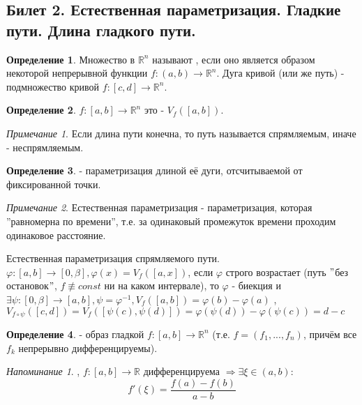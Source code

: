 \documentclass[a4paper]{article}
\theoremstyle{indented}
\theoremstyle{definition}
\newtheorem{defn}{Определение}
\theoremstyle{remark}
\newtheorem{remark}{Примечание}
\newtheorem{remind}{Напоминание}
\begin{document}
\subsection{Билет 2. Естественная параметризация. Гладкие пути. Длина гладкого пути.}

\begin{defn}
    Множество в $\mathbb{R}^n$ называют , если оно является образом некоторой непрерывной функции $f: (a,b)\to \mathbb{R}^n$. Дуга кривой (или же путь) - подмножество кривой $f: [c,d] \to \mathbb{R}^n$.
\end{defn}

\begin{defn}
     $f: [a,b]\to \mathbb{R}^n$ это - $V_f([a,b])$.
\end{defn}

\begin{remark}
    Если длина пути конечна, то путь называется спрямляемым, иначе - неспрямляемым.
\end{remark}

\begin{defn}
     - параметризация длиной её дуги, отсчитываемой от фиксированной точки.
\end{defn}

\begin{remark}
    Естественная параметризация - параметризация, которая ''равномерна по времени'', т.е. за одинаковый промежуток времени проходим одинаковое расстояние.
\end{remark}

Естественная параметризация спрямляемого пути. $\varphi:[a,b]\to[0,\beta], \varphi(x)=V_f([a,x])$, если $\varphi$ строго возрастает (путь $"$без остановок$"$, $f\not\equiv const$ ни на каком интервале),
то $\varphi$ - биекция и $\exists \psi: [0,\beta]\to[a,b], \psi=\varphi^{-1}, V_f([a,b])=\varphi(b)-\varphi(a)$ , 
$V_{f\circ \psi}([c,d])=V_f([\psi(c),\psi(d)]) = \varphi(\psi(d))-\varphi(\psi(c))=d-c$

\begin{defn}
     - образ гладкой $f: [a,b] \to \mathbb{R}^n$ (т.е. $f=(f_1,...,f_n)$, причём все $f_k$ непрерывно дифференцируемы).
\end{defn}

\begin{remind}
    , $f: [a,b] \to \mathbb{R}$ дифференцируема $\Rightarrow \exists \xi \in (a,b):$
    $$f'(\xi) = \frac{f(a)-f(b)}{a-b}$$
\end{remind}
\end{document}
